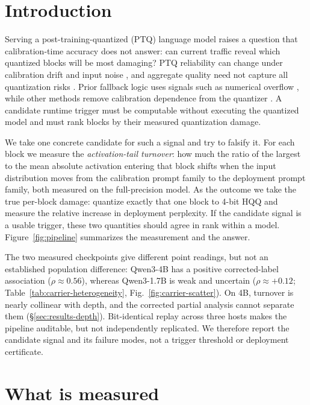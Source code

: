 \documentclass{article}
\begin{document}
\section{Introduction}
\label{sec:intro}
Serving a post-training-quantized (PTQ) language model raises a question that calibration-time
accuracy does not answer: can current traffic reveal which quantized blocks will be most damaging?
PTQ reliability can change under calibration drift and input noise \citep{yuan2023benchmarking},
and aggregate quality need not capture all quantization risks \citep{kadadekar2026qualitynotsafety}.
Prior fallback logic uses signals such as numerical overflow \citep{zhang2025int8fallback}, while
other methods remove calibration dependence from the quantizer \citep{son2025nsnquant}. A candidate
runtime trigger must be computable without executing the quantized model and must rank blocks by
their measured quantization damage.

We take one concrete candidate for such a signal and try to falsify it. For each block we measure
the \emph{activation-tail turnover}: how much the ratio of the largest to the mean absolute
activation entering that block shifts when the input distribution moves from the calibration
prompt family to the deployment prompt family, both measured on the full-precision model. As the
outcome we take the true per-block damage: quantize exactly that one block to 4-bit HQQ
\citep{badri2023hqq} and measure the relative increase in deployment perplexity. If the candidate
signal is a usable trigger, these two quantities should agree in rank within a model.
Figure~\ref{fig:pipeline} summarizes the measurement and the answer.

The two measured checkpoints give different point readings, but not an established population
difference: Qwen3-4B \citep{yang2025qwen3} has a positive corrected-label association
($\rho\approx0.56$), whereas Qwen3-1.7B is weak and uncertain ($\rho\approx+0.12$;
Table~\ref{tab:carrier-heterogeneity}, Fig.~\ref{fig:carrier-scatter}). On 4B, turnover is nearly
collinear with depth, and the corrected partial analysis cannot separate them
(\S\ref{sec:results-depth}). Bit-identical replay across three hosts makes the pipeline auditable,
but not independently replicated. We therefore report the candidate signal and its failure modes,
not a trigger threshold or deployment certificate.

\section{What is measured}
\label{sec:method}
\end{document}
